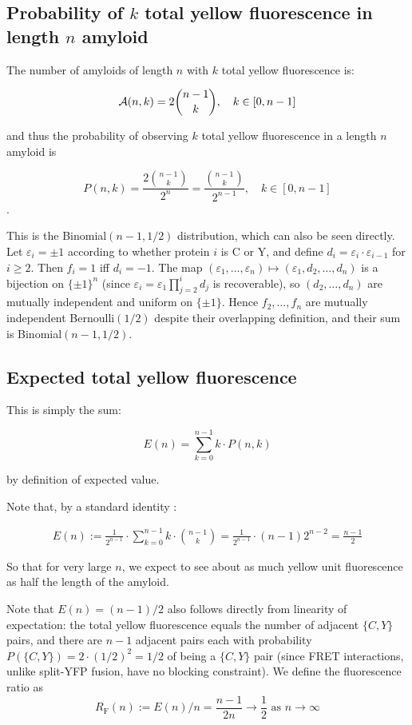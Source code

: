 \documentclass[referee,lineno,pdflatex,sn-mathphys-ay]{sn-jnl}
\newcommand{\cA}{ {\cal A} }
\begin{document}
\subsection{Probability of $k$ total yellow fluorescence in length $n$ amyloid}

The number of amyloids of length $n$ with $k$ total yellow fluorescence is:

\[
\cA(n,k) = 2\binom{n-1}{k}, \quad k \in [0,n - 1]
\]

and thus the probability of observing $k$ total yellow fluorescence in a length $n$ amyloid is


\[
P(n,k) = \frac{2\binom{n-1}{k}}{2^n} = \frac{\binom{n-1}{k}}{2^{n-1}}, \quad k \in [0,n - 1]
\].

This is the Binomial$(n-1, 1/2)$ distribution, which can also be seen directly. Let $\varepsilon_i = \pm 1$ according to whether protein $i$ is C or Y, and define $d_i = \varepsilon_i \cdot \varepsilon_{i-1}$ for $i \ge 2$. Then $f_i = 1$ iff $d_i = -1$. The map $(\varepsilon_1, \ldots, \varepsilon_n) \mapsto (\varepsilon_1, d_2, \ldots, d_n)$ is a bijection on $\{\pm 1\}^n$ (since $\varepsilon_i = \varepsilon_1 \prod_{j=2}^i d_j$ is recoverable), so $(d_2, \ldots, d_n)$ are mutually independent and uniform on $\{\pm 1\}$. Hence $f_2, \ldots, f_n$ are mutually independent Bernoulli$(1/2)$ despite their overlapping definition, and their sum is Binomial$(n-1, 1/2)$.

\subsection{Expected total yellow fluorescence}

This is simply the sum:

\[
    E(n) = \sum_{k = 0}^{n - 1} k \cdot P(n,k) 
\]

by definition of expected value.

Note that, by a standard identity \citep[\S 5.1, Eq.~5.5]{gkp1994}:

\begin{align*}
E(n) := \frac{1}{2^{n-1}} \cdot \sum_{k=0}^{n - 1} k \cdot \binom{n-1}{k} 
 =  \frac{1}{2^{n-1}} \cdot (n-1) 2^{n-2} = \frac{n - 1}{2}
\end{align*}

So that for very large $n$, we expect to see about as much yellow unit fluorescence as half the length of the amyloid.

Note that $E(n) = (n-1)/2$ also follows directly from linearity of expectation: the total yellow fluorescence equals the number of adjacent $\{C,Y\}$ pairs, and there are $n - 1$ adjacent pairs each with probability $P(\{C,Y\}) = 2 \cdot (1/2)^2 = 1/2$ of being a $\{C,Y\}$ pair (since FRET interactions, unlike split-YFP fusion, have no blocking constraint). We define the fluorescence ratio as
\[
R_{\text{F}}(n) := E(n)/n = \frac{n-1}{2n} \longrightarrow \frac{1}{2} \text{ as } n \to \infty
\]
\end{document}
